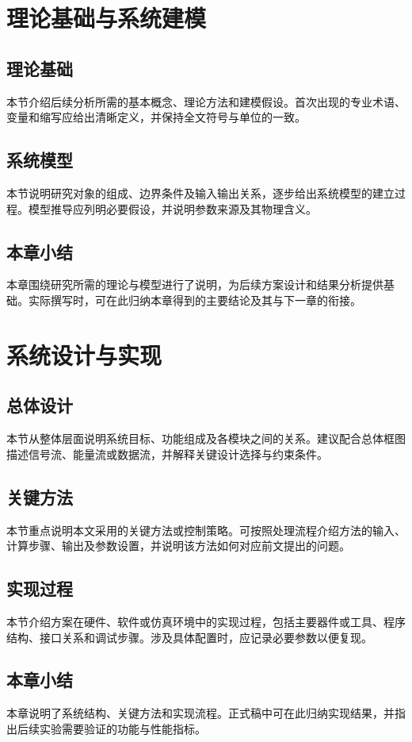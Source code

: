 {\chapter{理论基础与系统建模}
\section{理论基础}
本节介绍后续分析所需的基本概念、理论方法和建模假设。首次出现的专业术语、变量和缩写应给出清晰定义，并保持全文符号与单位的一致。
\section{系统模型}
本节说明研究对象的组成、边界条件及输入输出关系，逐步给出系统模型的建立过程。模型推导应列明必要假设，并说明参数来源及其物理含义。
\section{本章小结}
本章围绕研究所需的理论与模型进行了说明，为后续方案设计和结果分析提供基础。实际撰写时，可在此归纳本章得到的主要结论及其与下一章的衔接。

\chapter{系统设计与实现}
\section{总体设计}
本节从整体层面说明系统目标、功能组成及各模块之间的关系。建议配合总体框图描述信号流、能量流或数据流，并解释关键设计选择与约束条件。
\section{关键方法}
本节重点说明本文采用的关键方法或控制策略。可按照处理流程介绍方法的输入、计算步骤、输出及参数设置，并说明该方法如何对应前文提出的问题。
\section{实现过程}
本节介绍方案在硬件、软件或仿真环境中的实现过程，包括主要器件或工具、程序结构、接口关系和调试步骤。涉及具体配置时，应记录必要参数以便复现。
\section{本章小结}
本章说明了系统结构、关键方法和实现流程。正式稿中可在此归纳实现结果，并指出后续实验需要验证的功能与性能指标。

}
